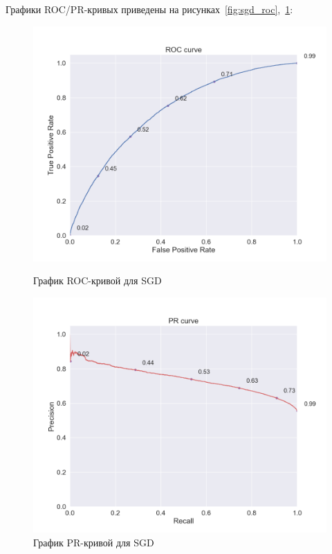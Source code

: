 \begin{table}[h]
    \caption{Значения метрик для SGD}
    \label{tab:sgd_quality}
\end{table}

Графики ROC/PR-кривых приведены на рисунках~\ref{fig:sgd_roc},~\ref{fig:sgd_pr}:

\begin{figure}[h!]
\centering
\begin{minipage}{.5\textwidth}
\centering
\includegraphics[width=1.0\linewidth]{images/sgd/roc_curve}
\caption{График ROC-кривой для SGD}
\label{fig:sgd_roc}
\end{minipage}%
\begin{minipage}{.5\textwidth}
\centering
\includegraphics[width=1.0\linewidth]{images/sgd/pr_curve}
\caption{График PR-кривой для SGD}
\label{fig:sgd_pr}
\end{minipage}
\end{figure}

